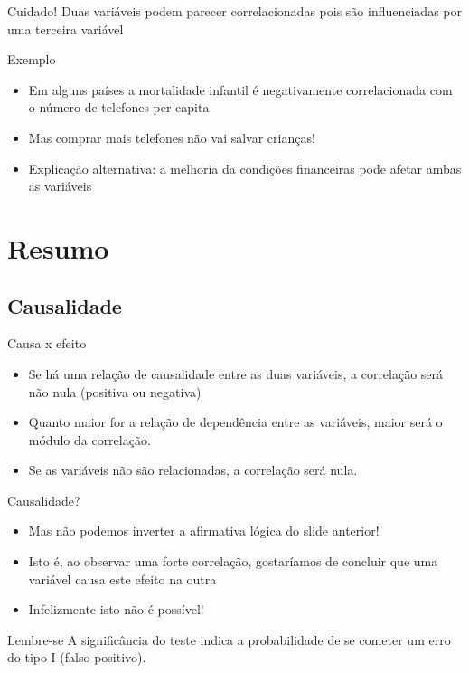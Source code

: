 \documentclass{beamer}
\begin{document}
\begin{frame}{\scriptsize }
  \begin{block}{Cuidado!}
    \footnotesize
    Duas variáveis podem \alert{parecer} correlacionadas pois são
    influenciadas por uma terceira variável
  \end{block}
  \begin{exampleblock}{Exemplo}
    \footnotesize
    \begin{itemize}
      \footnotesize
    \item Em alguns países a mortalidade infantil é negativamente
      correlacionada com o número de telefones per capita
    \item Mas comprar mais telefones não vai salvar crianças!
      \bigskip
    \item Explicação alternativa: a melhoria da condições financeiras
      pode afetar ambas as variáveis
    \end{itemize}    
  \end{exampleblock}
\end{frame}

\section{Resumo}

\subsection{Causalidade}

\begin{frame}{\scriptsize Causa x efeito}
  \begin{itemize}
    \footnotesize
  \item Se há uma relação de causalidade entre as duas variáveis, a
    correlação será não nula (positiva ou negativa)
    \bigskip
  \item Quanto maior for a relação de dependência entre as variáveis,
    maior será o módulo da correlação.
    \bigskip
  \item Se as variáveis não são relacionadas, a correlação será nula.
  \end{itemize}
\end{frame}

\begin{frame}{\scriptsize Causalidade?}
  \begin{itemize}
    \footnotesize
  \item Mas não podemos inverter a afirmativa lógica do slide
    anterior!
    \bigskip
  \item Isto é, ao observar uma forte correlação, gostaríamos de
    concluir que uma variável \alert{causa} este efeito na outra
    \bigskip
  \item Infelizmente isto não é possível!
  \end{itemize}
  \vfill
  \begin{block}{Lembre-se}
    \scriptsize
    A significância do teste indica a probabilidade de se cometer um
    erro do tipo I (falso positivo).
  \end{block}
\end{frame}
\end{document}
